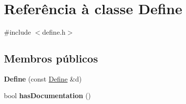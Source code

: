 \hypertarget{class_define}{\section{Referência à classe Define}
\label{class_define}
}


{\ttfamily \#include $<$define.\-h$>$}

\subsection*{Membros públicos}
\begin{DoxyCompactItemize}
\item 
\hypertarget{class_define_a7d014c6c9a74ce90a77567bcee6b48ee}{{\bfseries Define} (const \hyperlink{class_define}{Define} \&d)}\label{class_define_a7d014c6c9a74ce90a77567bcee6b48ee}

\item 
\hypertarget{class_define_ae986ac90dc9b577cd57f318a1fd60690}{bool {\bfseries has\-Documentation} ()}\label{class_define_ae986ac90dc9b577cd57f318a1fd60690}

\end{DoxyCompactItemize}
